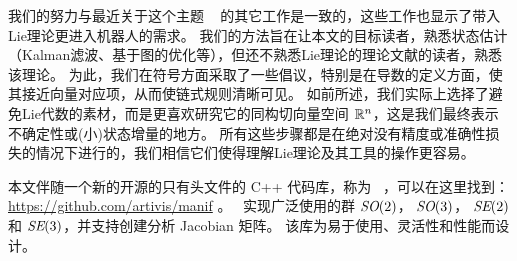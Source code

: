 我们的努力与最近关于这个主题 ~\cite{BARFOOT-17-Estimation,EADE-Lie,forster2017-TRO} 的其它工作是一致的，这些工作也显示了带入Lie理论更进入机器人的需求。
我们的方法旨在让本文的目标读者，熟悉状态估计（Kalman滤波、基于图的优化等），但还不熟悉Lie理论的理论文献的读者，熟悉该理论。
%
为此，我们在符号方面采取了一些倡议，特别是在导数的定义方面，使其接近向量对应项，从而使链式规则清晰可见。
如前所述，我们实际上选择了避免Lie代数的素材，而是更喜欢研究它的同构切向量空间 ${\mathbb R}^n$，这是我们最终表示不确定性或(小)状态增量的地方。
所有这些步骤都是在绝对没有精度或准确性损失的情况下进行的，我们相信它们使得理解Lie理论及其工具的操作更容易。

本文伴随一个新的开源的只有头文件的 C++ 代码库，称为 \manif\ \cite{DERAY-20-manif}，可以在这里找到： \url{https://github.com/artivis/manif} 。
\manif\ 实现广泛使用的群 $\textit{SO}(2)$， $\textit{SO}(3)$， $\textit{SE}(2)$ 和 $\textit{SE}(3)$，并支持创建分析 Jacobian 矩阵。
该库为易于使用、灵活性和性能而设计。

